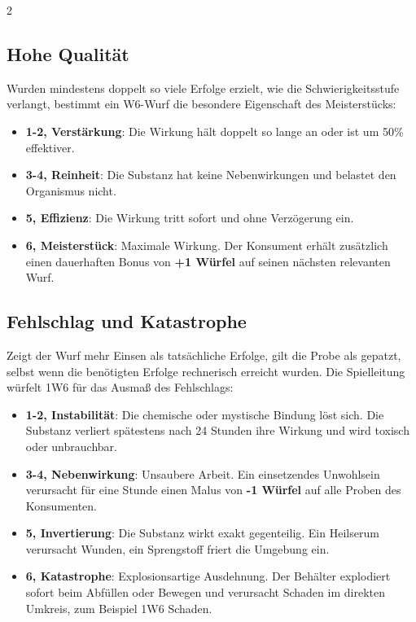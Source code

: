 \begin{multicols}{2}
\subsection{Hohe Qualität}

Wurden mindestens doppelt so viele Erfolge erzielt, wie die Schwierigkeitsstufe verlangt, bestimmt ein W6-Wurf die besondere Eigenschaft des Meisterstücks:

\begin{itemize}
    \item \textbf{1-2, Verstärkung}: Die Wirkung hält doppelt so lange an oder ist um 50\% effektiver.
    \item \textbf{3-4, Reinheit}: Die Substanz hat keine Nebenwirkungen und belastet den Organismus nicht.
    \item \textbf{5, Effizienz}: Die Wirkung tritt sofort und ohne Verzögerung ein.
    \item \textbf{6, Meisterstück}: Maximale Wirkung. Der Konsument erhält zusätzlich einen dauerhaften Bonus von \textbf{+1 Würfel} auf seinen nächsten relevanten Wurf.
\end{itemize}

\subsection{Fehlschlag und Katastrophe}

Zeigt der Wurf mehr Einsen als tatsächliche Erfolge, gilt die Probe als gepatzt, selbst wenn die benötigten Erfolge rechnerisch erreicht wurden. Die Spielleitung würfelt 1W6 für das Ausmaß des Fehlschlags:

\begin{itemize}
    \item \textbf{1-2, Instabilität}: Die chemische oder mystische Bindung löst sich. Die Substanz verliert spätestens nach 24 Stunden ihre Wirkung und wird toxisch oder unbrauchbar.
    \item \textbf{3-4, Nebenwirkung}: Unsaubere Arbeit. Ein einsetzendes Unwohlsein verursacht für eine Stunde einen Malus von \textbf{-1 Würfel} auf alle Proben des Konsumenten.
    \item \textbf{5, Invertierung}: Die Substanz wirkt exakt gegenteilig. Ein Heilserum verursacht Wunden, ein Sprengstoff friert die Umgebung ein.
    \item \textbf{6, Katastrophe}: Explosionsartige Ausdehnung. Der Behälter explodiert sofort beim Abfüllen oder Bewegen und verursacht Schaden im direkten Umkreis, zum Beispiel 1W6 Schaden.
\end{itemize}


\end{multicols}
